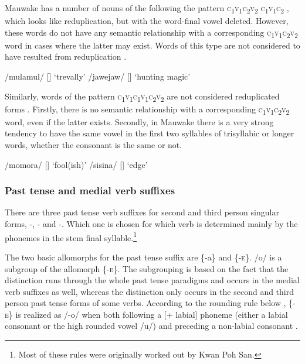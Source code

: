 Mauwake has a number of nouns of the following the pattern \textsc{c}\textsubscript{1}\textsc{v}\textsubscript{1}\textsc{c}\textsubscript{2}\textsc{v}\textsubscript{2} \textsc{c}\textsubscript{1}\textsc{v}\textsubscript{1}\textsc{c}\textsubscript{2} , which looks like reduplication, but with the word-final vowel deleted.  However, these words do not have any semantic relationship with a corresponding \textsc{c}\textsubscript{1}\textsc{v}\textsubscript{1}\textsc{c}\textsubscript{2}\textsc{v}\textsubscript{2} word in cases where the latter may exist.  Words of this type are not considered to have resulted from reduplication .

\ea
\label{ex:2:nonredup}
\ea
/mulamul/  []  `trevally'
\ex
/jawejaw/  []  `hunting magic'
\z
\z

Similarly, words of the pattern \textsc{c}\textsubscript{1}\textsc{v}\textsubscript{1}\textsc{c}\textsubscript{1}\textsc{v}\textsubscript{1}\textsc{c}\textsubscript{2}\textsc{v}\textsubscript{2} are not considered reduplicated forms .  Firstly, there is no semantic relationship with a corresponding \textsc{c}\textsubscript{1}\textsc{v}\textsubscript{1}\textsc{c}\textsubscript{2}\textsc{v}\textsubscript{2} word, even if the latter exists. Secondly, in Mauwake there is a very strong tendency to have the same vowel in the first two syllables of trisyllabic or longer words, whether the consonant is the same or not. 

\ea
\label{ex:2:nonredup2}
\ea
/momora/  []  `fool(ish)'
\ex
/sisina/  []  `edge'
\z
\z

\subsubsection{Past tense and medial verb suffixes}\label{sec:2.3.3.3}


There are three past tense verb suffixes for second and third person singular forms, -, - and -.  Which one is chosen for which verb is determined mainly by the phonemes in the stem final syllable.\footnote{Most of these rules were originally worked out by Kwan Poh San.}

The two basic allomorphs for the past tense suffix are \{-a\} and \{-\textsc{e}\}. /\textstyleStyleVernacularWordsItalic{-}o/ is a subgroup of the allomorph \{-\textsc{e}\}. The subgrouping is based on the fact that the  distinction runs through the whole past tense paradigms and occurs in the medial verb suffixes as well, whereas the \textstyleStyleVernacularWordsItalic{-} distinction only occurs in the second and third person past tense forms of some verbs.  According to the rounding rule below , \{-\textsc{e}\} is realized as /-o/ when both following a [+ labial] phoneme (either a labial consonant or the high rounded vowel /u/) and preceding a non-labial consonant . 

